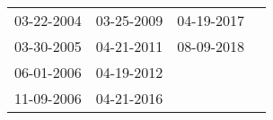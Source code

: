 \begin{supertabular}{llll}
 03-22-2004 &  03-25-2009 &  04-19-2017 \\
 03-30-2005 &  04-21-2011 &  08-09-2018 \\
 06-01-2006 &  04-19-2012 &             \\
 11-09-2006 &  04-21-2016 &             \\
\end{supertabular}
